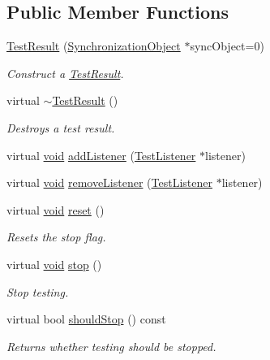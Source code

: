 \subsection*{Public Member Functions}
\begin{DoxyCompactItemize}
\item 
\hyperlink{class_test_result_a51781d20e0edeceae06589f1d9c90b48}{Test\-Result} (\hyperlink{class_synchronized_object_1_1_synchronization_object}{Synchronization\-Object} $\ast$sync\-Object=0)
\begin{DoxyCompactList}\small\item\em Construct a \hyperlink{class_test_result}{Test\-Result}. \end{DoxyCompactList}\item 
virtual \hyperlink{class_test_result_a318d2696f70564678f866bad6d5510b6}{$\sim$\-Test\-Result} ()
\begin{DoxyCompactList}\small\item\em Destroys a test result. \end{DoxyCompactList}\item 
virtual \hyperlink{wglew_8h_aeea6e3dfae3acf232096f57d2d57f084}{void} \hyperlink{class_test_result_aaa44db4de1b095eff670e433f12d51de}{add\-Listener} (\hyperlink{class_test_listener}{Test\-Listener} $\ast$listener)
\item 
virtual \hyperlink{wglew_8h_aeea6e3dfae3acf232096f57d2d57f084}{void} \hyperlink{class_test_result_a695fb70894352cead51d0db8ec59b3e8}{remove\-Listener} (\hyperlink{class_test_listener}{Test\-Listener} $\ast$listener)
\item 
virtual \hyperlink{wglew_8h_aeea6e3dfae3acf232096f57d2d57f084}{void} \hyperlink{class_test_result_a5122b5d4edddb4b2d4ea9c214eed8c3f}{reset} ()
\begin{DoxyCompactList}\small\item\em Resets the stop flag. \end{DoxyCompactList}\item 
virtual \hyperlink{wglew_8h_aeea6e3dfae3acf232096f57d2d57f084}{void} \hyperlink{class_test_result_ada481ef1a01dfa7737a1bf019f352855}{stop} ()
\begin{DoxyCompactList}\small\item\em Stop testing. \end{DoxyCompactList}\item 
virtual bool \hyperlink{class_test_result_a20831556df184132ea80836c196ed333}{should\-Stop} () const 
\begin{DoxyCompactList}\small\item\em Returns whether testing should be stopped. \end{DoxyCompactList}\item 

\end{DoxyCompactItemize}
